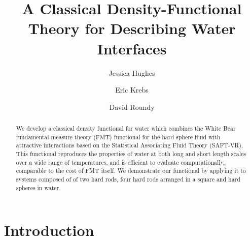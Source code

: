 \documentclass[letterpaper,twocolumn,amsmath,amssymb,prb]{revtex4-1}
\begin{document}
\title{A Classical Density-Functional Theory for Describing Water Interfaces}

\author{Jessica Hughes}
\author{Eric Krebs}
\author{David Roundy}

\begin{abstract}
We develop a classical density functional for water which combines the
White Bear fundamental-measure theory (FMT)
functional\cite{roth2002whitebear} for the hard sphere fluid with
attractive interactions based on the Statistical Associating Fluid
Theory (SAFT-VR)\cite{clark2006developing}.
This functional reproduces the properties of water at both long and
short length scales over a wide range of temperatures, and is
efficient to evaluate computationally, comparable to the cost of FMT
itself.  We demonstrate our functional by applying it to systems
composed of of two hard rods, four hard rods arranged in a square and
hard spheres in water.
\end{abstract}
\maketitle

\section{Introduction}
\end{document}
